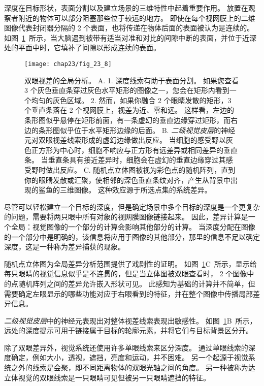 深度在目标形状，表面分割以及建立场景的三维特性中起着重要作用。
放置在观察者附近的物体可以部分阻塞那些位于较远的地方。
即使在每个视网膜上的二维图像代表封闭器分隔的 2 个表面，也将传递在物体后面的表面被认为是连续的。
如图~\ref{fig:23_8}~所示，当大脑遇到被带有适当对准和对比的间隙中断的表面，并位于近深处的平面中时，它填补了间隙以形成连续的表面。


\begin{figure}[htbp]
	\centering
	\texttt{[image: chap23/fig\_23\_8]}
	\caption{双眼视差的全局分析。
		A. 1. 深度线索有助于表面分割。
		如果您查看 3 个灰色垂直条穿过灰色水平矩形的图像之一，您会在矩形内看到一个均匀的灰色区域。
		2. 然而，如果你融合 2 个眼睛发散的矩形，3 个垂直条落在 2 个视网膜上，视差为近、零和远。
		这样看，左边的条形图似乎悬停在矩形前面，有一条虚幻的垂直边缘穿过矩形，而右边的条形图似乎位于水平矩形边缘的后面。
		B. \textit{二级视觉皮层}的神经元对双眼视差线索形成的虚幻边缘做出反应。
		当细胞的感受野以灰色正方形为中心时，细胞不响应与正方形有远差异或相同差异的垂直条。
		当垂直条具有接近差异时，细胞会在虚幻的垂直边缘穿过其感受野时做出反应\cite{bakin2000visual}。
		C. 随机点立体图被视为彩色点的随机阵列，直到你的眼睛发散或汇聚，使相邻的深色垂直条纹对齐，产生从背景中出现的鲨鱼的三维图像。
		这种效应源于所选点集的系统差异。}
	\label{fig:23_8}
\end{figure}


尽管可以轻松建立一个目标的深度，但是确定场景中多个目标的深度是一个更复杂的问题，需要将两只眼中所有对象的视网膜图像链接起来。
因此，差异计算是一个全局：视觉图像的一个部分的计算会影响其他部分的计算。
当深度分配在图像的一个部分中是明确的，该信息将应用于图像的其他部分，那里的信息不足以确定深度，这是一种称为差异捕获的现象。


随机点立体图为全局差异分析范围提供了戏剧性的证明。
如图~\ref{fig:23_8}C~所示，显示给每只眼睛的视觉信息似乎是不连贯的，但是当立体图被双眼查看时， 2 个图像中的点随机阵列之间的差异允许嵌入形状可见。
此感知为基础的计算并不简单，但需要确定左眼显示的哪些功能对应于右眼看到的特征，并在整个图像中传播局部差异信息。


\textit{二级视觉皮层}中的神经元表现出对整体视差线索表现出敏感性。
如图~\ref{fig:23_8}B~所示，远处的深度提示可用于链接属于目标的轮廓元素，并将它们与目标背景区分开。


除了双眼差异外，视觉系统还使用许多单眼线索来区分深度。
通过单眼线索的深度确定，例如大小，透视，遮挡，亮度和运动，并不困难。
另一个起源于视觉系统之外的线索是会聚，即不同距离物体的双眼光轴之间的角度。
另一种被称为达立体视觉的双眼线索是一只眼睛可见但被另一只眼睛遮挡的特征。


